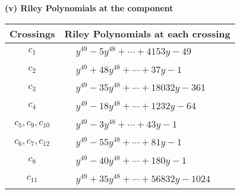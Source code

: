 \documentclass[1p]{elsarticle_modified}
\theoremstyle{definition}
\begin{document}
\newpage\renewcommand{\arraystretch}{1}
\flushleft \textbf{(v) Riley Polynomials at the component}\newline \\
\begin{tabular}{m{50pt}|m{274pt}}
Crossings & \hspace{64pt}Riley Polynomials at each crossing \\
\hline $$\begin{aligned}c_{1}\end{aligned}$$&$\begin{aligned}
&y^{49}-5 y^{48}+\cdots+4153 y-49
\end{aligned}$\\
\hline $$\begin{aligned}c_{2}\end{aligned}$$&$\begin{aligned}
&y^{49}+48 y^{48}+\cdots+37 y-1
\end{aligned}$\\
\hline $$\begin{aligned}c_{3}\end{aligned}$$&$\begin{aligned}
&y^{49}-35 y^{48}+\cdots+18032 y-361
\end{aligned}$\\
\hline $$\begin{aligned}c_{4}\end{aligned}$$&$\begin{aligned}
&y^{49}-18 y^{48}+\cdots+1232 y-64
\end{aligned}$\\
\hline $$\begin{aligned}c_{5},c_{9},c_{10}\end{aligned}$$&$\begin{aligned}
&y^{49}-3 y^{48}+\cdots+43 y-1
\end{aligned}$\\
\hline $$\begin{aligned}c_{6},c_{7},c_{12}\end{aligned}$$&$\begin{aligned}
&y^{49}-55 y^{48}+\cdots+81 y-1
\end{aligned}$\\
\hline $$\begin{aligned}c_{8}\end{aligned}$$&$\begin{aligned}
&y^{49}-40 y^{48}+\cdots+180 y-1
\end{aligned}$\\
\hline $$\begin{aligned}c_{11}\end{aligned}$$&$\begin{aligned}
&y^{49}+35 y^{48}+\cdots+56832 y-1024
\end{aligned}$\\
\hline
\end{tabular}\\~\\
\end{document}
